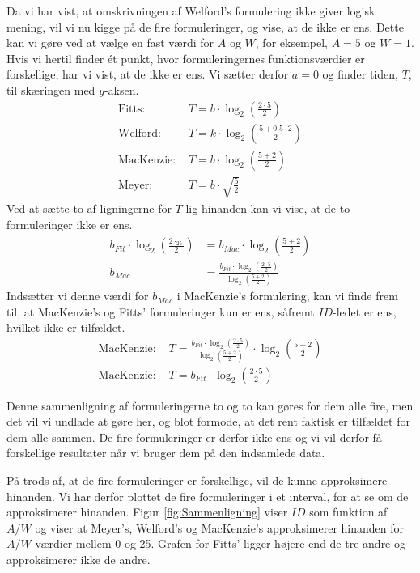 Da vi har vist, at omskrivningen af Welford's formulering ikke giver logisk mening, vil vi nu kigge på de fire formuleringer, og vise, at de ikke er ens. Dette kan vi gøre ved at vælge en fast værdi for $A$ og $W$, for eksempel, $A = 5$ og $W = 1$. Hvis vi hertil finder ét punkt, hvor formuleringernes funktionsværdier er forskellige, har vi vist, at de ikke er ens. Vi sætter derfor $a=0$ og finder tiden, $T$, til skæringen med $y$-aksen.
\begin{align*}
\text{Fitts: } &T=b\cdot\log_2\left(\frac{2\cdot5}{2}\right)\\
\text{Welford: } &T=k\cdot\log_2\left(\frac{5+0.5\cdot 2}{2}\right)\\
\text{MacKenzie: } &T=b\cdot\log_2\left(\frac{5 + 2}{2}\right)\\
\text{Meyer: } &T=b\cdot\sqrt{\frac{5}{2}}
\end{align*}
Ved at sætte to af ligningerne for $T$ lig hinanden kan vi vise, at de to formuleringer ikke er ens.
\begin{align*}
b_{Fit}\cdot\log_2\left(\frac{2\cdot_25}{2}\right)&=b_{Mac}\cdot\log_2\left(\frac{5 + 2}{2}\right)\\
b_{Mac} &= \frac{b_{Fit}\cdot\log_2\left(\frac{2\cdot5}{2}\right)}{\log_2\left(\frac{5 + 2}{2}\right)}
\end{align*}
Indsætter vi denne værdi for $b_{Mac}$ i MacKenzie's formulering, kan vi finde frem til, at MacKenzie's og Fitts' formuleringer kun er ens, såfremt $ID$-ledet er ens, hvilket ikke er tilfældet.
\begin{align*}
\text{MacKenzie: } &T =\frac{b_{Fit}\cdot\log_2\left(\frac{2\cdot5}{2}\right)}{\log_2\left(\frac{5 + 2}{2}\right)}\cdot\log_2\left(\frac{5 + 2}{2}\right)\\
\text{MacKenzie: } &T =b_{Fit}\cdot\log_2\left(\frac{2\cdot5}{2}\right)
\end{align*}

Denne sammenligning af formuleringerne to og to kan gøres for dem alle fire, men det vil vi undlade at gøre her, og blot formode, at det rent faktisk er tilfældet for dem alle sammen. De fire formuleringer er derfor ikke ens og vi vil derfor få forskellige resultater når vi bruger dem på den indsamlede data.

På trods af, at de fire formuleringer er forskellige, vil de kunne approksimere hinanden. Vi har derfor plottet de fire formuleringer i et interval, for at se om de approksimerer hinanden. Figur \ref{fig:Sammenligning} viser $ID$ som funktion af $A/W$ og viser at Meyer's, Welford's og MacKenzie's approksimerer hinanden for $A/W$-værdier mellem 0 og 25. Grafen for Fitts' ligger højere end de tre andre og approksimerer ikke de andre.


